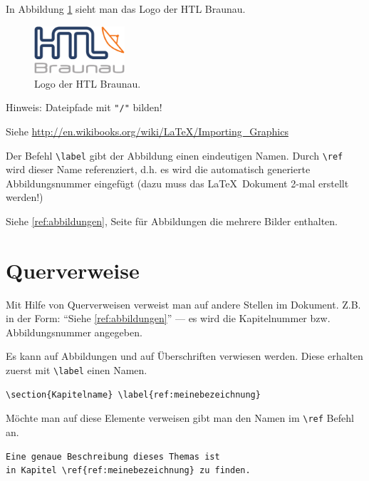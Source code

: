 \begin{framed}
In Abbildung \ref{fig:htl01} sieht man das Logo der HTL Braunau.
\begin{figure}[H]
	\centering
	\includegraphics[width=0.3\textwidth]{./media/images/htl_c_cmyk_rein.pdf}
  	\caption{Logo der HTL Braunau.}
  	\label{fig:htl01}
\end{figure}
\end{framed}

Hinweis: Dateipfade mit \verb+"/"+ bilden!

Siehe
\url{http://en.wikibooks.org/wiki/LaTeX/Importing_Graphics}

Der Befehl \lstinline{\label} gibt der Abbildung einen eindeutigen Namen.
Durch \lstinline{\ref} wird dieser Name referenziert, d.h. es wird die automatisch generierte Abbildungsnummer eingefügt (dazu muss das \LaTeX\ Dokument 2-mal erstellt werden!)

Siehe \ref{ref:abbildungen}, Seite \pageref{ref:abbildungen} für Abbildungen die mehrere Bilder enthalten.

\section{Querverweise}

Mit Hilfe von Querverweisen verweist man auf andere Stellen im Dokument. 
Z.B. in der Form: "`Siehe \ref{ref:abbildungen}"' --- es wird die Kapitelnummer bzw. Abbildungsnummer angegeben.

Es kann auf Abbildungen und auf Überschriften verwiesen werden.
Diese erhalten zuerst mit \lstinline{\label} einen Namen.
\begin{Verbatim}[frame=single]
\section{Kapitelname} \label{ref:meinebezeichnung}
\end{Verbatim}

Möchte man auf diese Elemente verweisen gibt man den Namen im \lstinline{\ref} Befehl an.
\begin{Verbatim}[frame=single]
Eine genaue Beschreibung dieses Themas ist 
in Kapitel \ref{ref:meinebezeichnung} zu finden.
\end{Verbatim}


